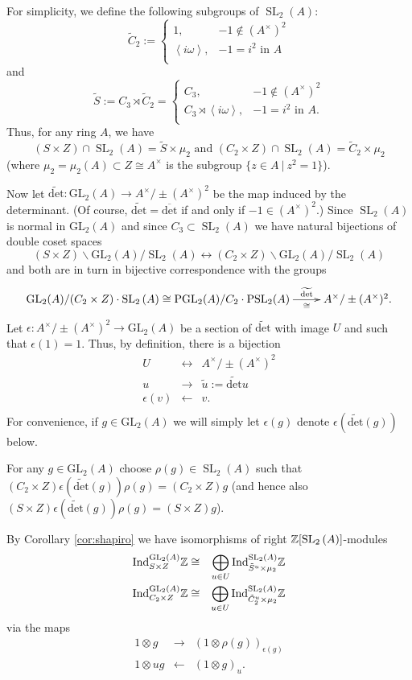 \documentclass[12pt]{amsart}
\theoremstyle{definition}
\newcommand{\Z}{\Bbb{Z}}
\newcommand{\spl}[2]{\operatorname{SL}_{#1}\left(#2\right)}
\newcommand{\pspl}[2]{\mathrm{PSL}_{#1}(#2)}
\newcommand{\gl}[2]{\mathrm{GL}_{#1}(#2)}
\newcommand{\pgl}[2]{\mathrm{PGL}_{#1}(#2)}
\newcommand{\<}{\langle}
\renewcommand{\>}{\rangle}
\newcommand{\an}[1]{\left\langle{#1}\right\rangle}
\newcommand{\odet}{\overline{\mathrm{det}}}
\newcommand{\oodet}{\widetilde{\mathrm{det}}}
\newcommand{\Ind}[3]{\mathrm{Ind}_{#1}^{#2}#3}
\begin{document}
For simplicity, we define the following subgroups of $\spl{2}{A}$:
\[
\tilde{C}_2:=
\left\{
\begin{array}{ll}
1,& -1\not\in (A^\times)^2\\
\an{i\omega}, & -1=i^2 \mbox{ in }A\\
\end{array}
\right.
\]
and
\[
\tilde{S}:=C_3\rtimes \tilde{C}_2=
\left\{
\begin{array}{ll}
C_3,& -1\not\in (A^\times)^2\\
C_3\rtimes\an{i\omega}, & -1=i^2 \mbox{ in }A.\\
\end{array}
\right.
\]
Thus, for any ring $A$, we have 
\[
(S\times Z)\cap \spl{2}{A}=\tilde{S}\times\mu_2 \mbox{ and }(C_2\times Z)\cap\spl{2}{A}=\tilde{C}_2\times \mu_2
\]
  (where $\mu_2=\mu_2(A)\subset Z\cong A^\times$ 
is the subgroup $\{ z\in A\ |\ z^2=1\}$).

Now let $\oodet:\gl{2}{A}\to A^\times/\pm(A^\times)^2$ be the map induced by the determinant. (Of course, $\oodet=\odet$ if and only if $-1\in (A^\times)^2$.) Since $\spl{2}{A}$ is normal in $\gl{2}{A}$ and since $C_3\subset \spl{2}{A}$ we have natural bijections of double coset spaces
\[
(S\times Z)\backslash \gl{2}{A}/\spl{2}{A}\leftrightarrow (C_2\times Z)\backslash \gl{2}{A}/\spl{2}{A}
\]
and both are in turn in bijective correspondence with the groups
\[
\xymatrix{
\gl{2}{A}/(C_2\times Z)\cdot\spl{2}{A}\cong \pgl{2}{A}/C_2\cdot\pspl{2}{A}\ar_-{\cong}^-{\oodet}[r]&A^\times/\pm(A^\times)^2.
}
\]
Let $\epsilon:A^\times/\pm(A^\times)^2\to \gl{2}{A}$ be a section of $\oodet$ with image $U$ and such that $\epsilon(1)=1$. Thus, by definition, there is a bijection
\begin{eqnarray*}
U&\leftrightarrow&A^\times/\pm(A^\times)^2\\
u&\rightarrow&\tilde{u}:=\oodet{u}\\
\epsilon(v)&\leftarrow&v.\\
\end{eqnarray*}
For convenience, if $g\in \gl{2}{A}$ we will simply let $\epsilon(g)$ denote $\epsilon(\oodet(g))$ below. 

For any $g\in \gl{2}{A}$ choose 
$\rho(g)\in\spl{2}{A}$ such that $(C_2\times Z)\epsilon(\oodet(g))\rho(g)=(C_2\times Z)g$ (and hence also $(S\times Z)\epsilon(\oodet(g))\rho(g)=(S\times Z)g$). 

By 
Corollary \ref{cor:shapiro} we have isomorphisms of right $\Z[\spl{2}{A}]$-modules
\begin{eqnarray*}
\Ind{S\times Z}{\gl{2}{A}}\Z&\cong & \bigoplus_{u\in U}\Ind{\tilde{S}^u\times\mu_2}{\spl{2}{A}}\Z\\
\Ind{C_2\times Z}{\gl{2}{A}}\Z&\cong & \bigoplus_{u\in U}\Ind{\tilde{C}_2^u\times\mu_2}{\spl{2}{A}}\Z\\
\end{eqnarray*}
via the maps
\begin{eqnarray*}
1\otimes g&\rightarrow & (1\otimes\rho(g))_{\epsilon(g)}\\
1\otimes ug&\leftarrow& (1\otimes g)_u.\\
\end{eqnarray*}
\end{document}
